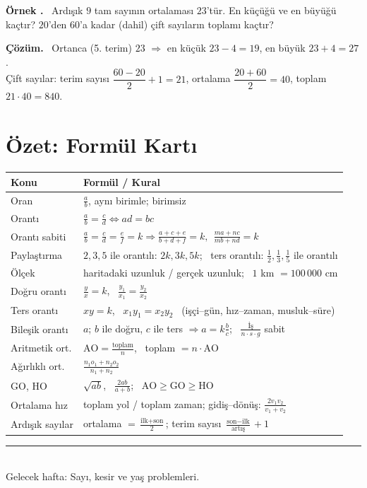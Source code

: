 \documentclass[11pt,a4paper]{article}
\newcounter{ornek}
\newenvironment{ornek}{\refstepcounter{ornek}\par\medskip\needspace{7\baselineskip}\noindent\textbf{\color{anamavi}Örnek \theornek.}\ }{\par}
\newenvironment{cozum}{\begin{tcolorbox}[colback=cozumyesil!6,colframe=cozumyesil,boxrule=0.5pt,left=4pt,right=4pt,top=2pt,bottom=2pt,breakable]\textbf{\color{cozumyesil}Çözüm.}\ }{\end{tcolorbox}}
\newcounter{alis}
\begin{document}
\begin{ornek}
Ardışık \(9\) tam sayının ortalaması \(23\)'tür. En küçüğü ve en büyüğü kaçtır? \(20\)'den \(60\)'a kadar (dahil) çift sayıların toplamı kaçtır?
\end{ornek}
\begin{cozum}
Ortanca (5. terim) \(23\) \(\Rightarrow\) en küçük \(23-4=19\), en büyük \(23+4=27\).\\
Çift sayılar: terim sayısı \(\dfrac{60-20}{2}+1=21\), ortalama \(\dfrac{20+60}{2}=40\), toplam \(21\cdot 40=840\).
\end{cozum}

\section{Özet: Formül Kartı}
\begin{center}
\renewcommand{\arraystretch}{1.6}
\begin{tabular}{@{}ll@{}}
\toprule
Konu & Formül / Kural\\\midrule
Oran & \(\frac{a}{b}\), aynı birimle; birimsiz\\
Orantı & \(\frac{a}{b}=\frac{c}{d}\Leftrightarrow ad=bc\)\\
Orantı sabiti & \(\frac{a}{b}=\frac{c}{d}=\frac{e}{f}=k\Rightarrow \frac{a+c+e}{b+d+f}=k,\ \ \frac{ma+nc}{mb+nd}=k\)\\
Paylaştırma & \(2,3,5\) ile orantılı: \(2k,3k,5k\); \ ters orantılı: \(\frac12,\frac13,\frac15\) ile orantılı\\
Ölçek & haritadaki uzunluk / gerçek uzunluk; \ \(1\) km \(=100\,000\) cm\\
Doğru orantı & \(\frac{y}{x}=k\), \ \(\frac{y_1}{x_1}=\frac{y_2}{x_2}\)\\
Ters orantı & \(xy=k\), \ \(x_1y_1=x_2y_2\) \ (işçi--gün, hız--zaman, musluk--süre)\\
Bileşik orantı & \(a\); \(b\) ile doğru, \(c\) ile ters \(\Rightarrow a=k\frac{b}{c}\); \ \(\frac{\text{İş}}{n\cdot s\cdot g}\) sabit\\
Aritmetik ort. & \(\text{AO}=\frac{\text{toplam}}{n}\), \ toplam \(=n\cdot\text{AO}\)\\
Ağırlıklı ort. & \(\frac{n_1o_1+n_2o_2}{n_1+n_2}\)\\
GO, HO & \(\sqrt{ab}\), \ \(\frac{2ab}{a+b}\); \ \(\text{AO}\ge\text{GO}\ge\text{HO}\)\\
Ortalama hız & toplam yol / toplam zaman; gidiş--dönüş: \(\frac{2v_1v_2}{v_1+v_2}\)\\
Ardışık sayılar & ortalama \(=\frac{\text{ilk}+\text{son}}{2}\); terim sayısı \(\frac{\text{son}-\text{ilk}}{\text{artış}}+1\)\\\bottomrule
\end{tabular}
\end{center}

\newpage


\vspace{2pt}
\noindent\textcolor{anamavi}{\rule{\textwidth}{0.5pt}}\\
{\small Gelecek hafta: Sayı, kesir ve yaş problemleri.}
\end{document}
